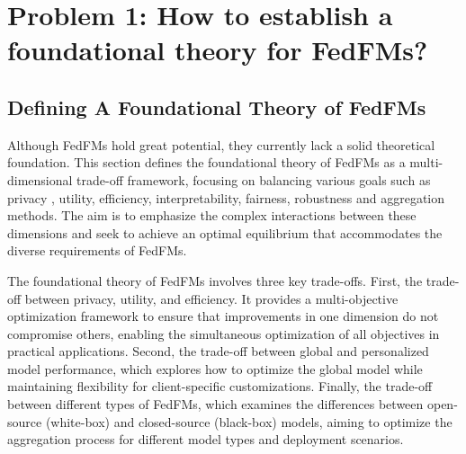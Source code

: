 
\section{Problem 1: How to establish a foundational theory for FedFMs?}

\label{ftheory}

\subsection{Defining A Foundational Theory of FedFMs}

Although FedFMs hold great potential, they currently lack a solid theoretical foundation. 
This section defines the foundational theory of FedFMs as a multi-dimensional trade-off framework, focusing on balancing various goals such as privacy , utility,  efficiency, interpretability, fairness, robustness and aggregation methods. The aim is to emphasize the complex interactions between these dimensions and seek to achieve an optimal equilibrium that accommodates the diverse requirements of FedFMs.

The foundational theory of FedFMs involves three key trade-offs. First, the trade-off between privacy, utility, and efficiency. It provides a multi-objective optimization framework to ensure that improvements in one dimension do not compromise others, enabling the simultaneous optimization of all objectives in practical applications. Second, the trade-off between global and personalized model performance, which explores how to optimize the global model while maintaining flexibility for client-specific customizations. Finally, the trade-off between different types of FedFMs, which examines the differences between open-source (white-box) and closed-source (black-box) models, aiming to optimize the aggregation process for different model types and deployment scenarios.

